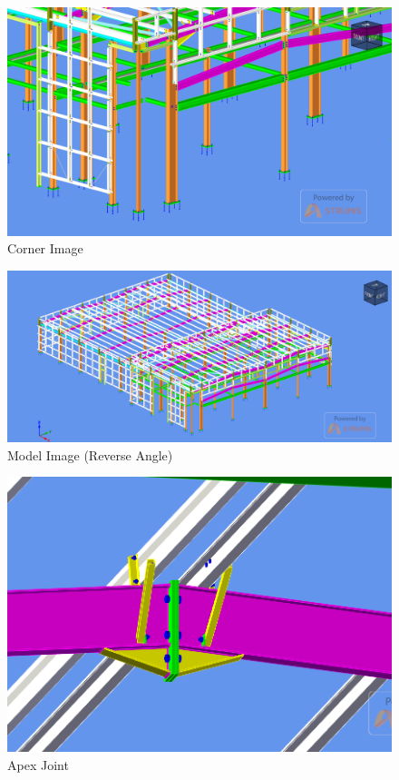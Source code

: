\begin{figure}
	\centering
	\includegraphics[width=1.0\linewidth]{./images/7.png}
	\caption{Corner Image}
	\label{fig:ass3img7}
\end{figure}

\begin{figure}
	\centering
	\includegraphics[width=1.0\linewidth]{./images/8.png}
	\caption{Model Image (Reverse Angle)}
	\label{fig:ass3img8}
\end{figure}

\begin{figure}
	\centering
	\includegraphics[width=1.0\linewidth]{./images/9.png}
	\caption{Apex Joint}
	\label{fig:ass3img9}
\end{figure}

